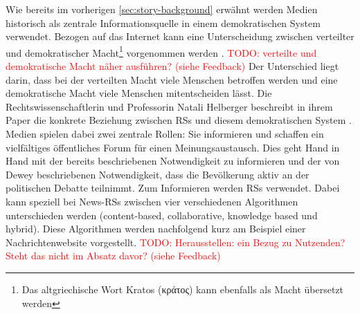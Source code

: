 Wie bereits im vorherigen \autoref{sec:story-background} erwähnt werden Medien historisch als zentrale Informationsquelle in einem demokratischen System verwendet.
Bezogen auf das Internet kann eine Unterscheidung zwischen verteilter und demokratischer Macht\footnote{Das altgriechische Wort Kratos (\textgreek{κράτος}) kann ebenfalls als Macht übersetzt werden} vorgenommen werden \cite{free-speech-algorithmic}.
\textcolor{red}{TODO: verteilte und demokratische Macht näher ausführen? (siehe Feedback)}
Der Unterschied liegt darin, dass bei der verteilten Macht viele Menschen betroffen werden und eine demokratische Macht viele Menschen mitentscheiden lässt.
Die Rechtswissenschaftlerin und Professorin Natali Helberger beschreibt in ihrem Paper die konkrete Beziehung zwischen \acp{RS} und diesem demokratischen System \cite{democratic-role}.
Medien spielen dabei zwei zentrale Rollen: Sie informieren und schaffen ein vielfältiges öffentliches Forum für einen Meinungsaustausch.
Dies geht Hand in Hand mit der bereits beschriebenen Notwendigkeit zu informieren und der von Dewey beschriebenen Notwendigkeit, dass die Bevölkerung aktiv an der politischen Debatte teilnimmt.
Zum Informieren werden \acp{RS} verwendet.
Dabei kann speziell bei News-\acp{RS} zwischen vier verschiedenen Algorithmen unterschieden werden (content-based, collaborative, knowledge based und hybrid).
Diese Algorithmen werden nachfolgend kurz am Beispiel einer Nachrichtenwebsite vorgestellt.
\textcolor{red}{TODO: Herausstellen: ein Bezug zu Nutzenden? Steht das nicht im Absatz davor? (siehe Feedback)} \\

